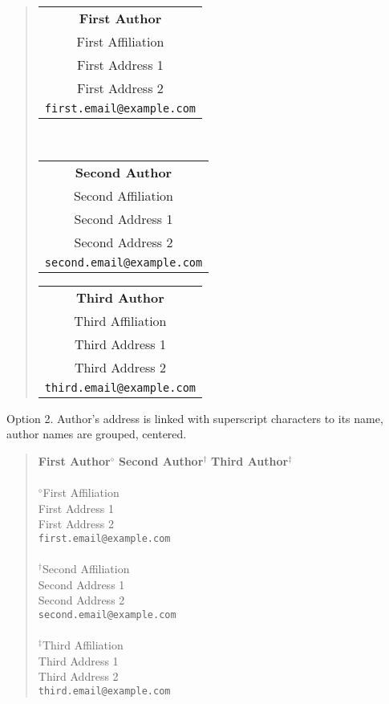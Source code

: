 \documentclass[11pt,a4paper]{article}
\begin{document}
\begin{quote}\centering
  \begin{tabular}{c}
    \textbf{First Author} \\
    First Affiliation \\
    First Address 1 \\
    First Address 2 \\
    \texttt{first.email@example.com}
  \end{tabular}
  \ 
  \begin{tabular}{c}
    \textbf{Second Author} \\
    Second Affiliation \\
    Second Address 1 \\
    Second Address 2 \\
    \texttt{second.email@example.com}
  \end{tabular}

  \begin{tabular}{c}
    \textbf{Third Author} \\
    Third Affiliation \\
    Third Address 1 \\
    Third Address 2 \\
    \texttt{third.email@example.com}
  \end{tabular}
\end{quote}
  

Option 2. Author’s address is linked with superscript characters to its name,
author names are grouped, centered.

\begin{quote}\centering
    \textbf{First Author$^\diamond$} \quad \textbf{Second Author$^\dagger$} \quad
    \textbf{Third Author$^\ddagger$}
    \\ \ \\
    $^\diamond$First Affiliation \\
    First Address 1 \\
    First Address 2 \\
    \texttt{first.email@example.com}
     \\ \ \\
     $^\dagger$Second Affiliation \\
    Second Address 1 \\
    Second Address 2 \\
    \texttt{second.email@example.com}
     \\ \ \\
    $^\ddagger$Third Affiliation \\
    Third Address 1 \\
    Third Address 2 \\
    \texttt{third.email@example.com}
\end{quote}
  
\fi
\end{document}
